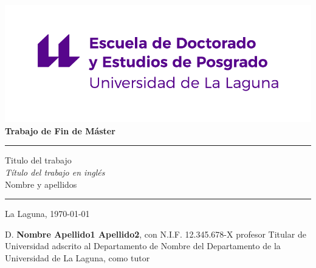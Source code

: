 \documentclass[12pt,a4paper,oneside]{report}
\begin{document}
\renewcommand\listtablename{Índice de Tablas}    
\renewcommand\listfigurename{Índice de Figuras}    

\pagestyle{empty}
\thispagestyle{empty}


\newcommand{\HRule}{\rule{\linewidth}{1mm}}
\setlength{\parindent}{0mm}
\setlength{\parskip}{0mm}


\begin{center}
\includegraphics[scale=0.8]{images/escuela-doctorado-posgrado-original}\\[10mm]
{\Huge\bf  Trabajo de Fin de Máster}
\end{center}

\HRule
\begin{flushright}
        {\Huge Titulo del trabajo} \\[2.5mm]
        {\Large \textit{Título del trabajo en inglés}} \\[5mm]
        {\Large Nombre y apellidos} \\[5mm]


\end{flushright}
\HRule
{}
\begin{center}
  \Large La Laguna, \today
\end{center}

\setlength{\parindent}{5mm}

\newpage
\thispagestyle{empty}

D. {\bf Nombre Apellido1 Apellido2}, con N.I.F. 12.345.678-X profesor Titular de Universidad adscrito al Departamento de Nombre del Departamento de la Universidad de La Laguna, como tutor
\end{document}
